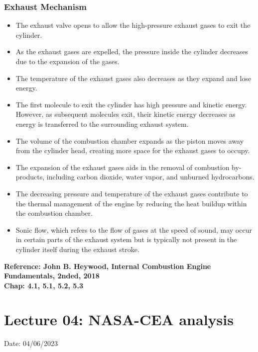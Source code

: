\documentclass{article}
\begin{document}
  \subsubsection*{Exhaust Mechanism}
  \begin{itemize}
	\item The exhaust valve opens to allow the high-pressure exhaust gases to exit the cylinder.

	\item As the exhaust gases are expelled, the pressure inside the cylinder decreases due to the expansion of the gases.
	
	\item The temperature of the exhaust gases also decreases as they expand and lose energy.
	
	\item The first molecule to exit the cylinder has high pressure and kinetic energy. However, as subsequent molecules exit, their kinetic energy decreases as energy is transferred to the surrounding exhaust system.
	
	\item The volume of the combustion chamber expands as the piston moves away from the cylinder head, creating more space for the exhaust gases to occupy.
	
	\item The expansion of the exhaust gases aids in the removal of combustion by-products, including carbon dioxide, water vapor, and unburned hydrocarbons.
	
	\item The decreasing pressure and temperature of the exhaust gases contribute to the thermal management of the engine by reducing the heat buildup within the combustion chamber.
	
	\item Sonic flow, which refers to the flow of gases at the speed of sound, may occur in certain parts of the exhaust system but is typically not present in the cylinder itself during the exhaust stroke.
  \end{itemize}
  \vspace*{1cm}
  \textbf{Reference: John B. Heywood, Internal Combustion Engine Fundamentals, 2nded, 2018\\ Chap: 4.1, 5.1, 5.2, 5.3}

  \pagebreak
  \section{Lecture 04: NASA-CEA analysis} 
	\hfill Date: 04/06/2023
\end{document}
